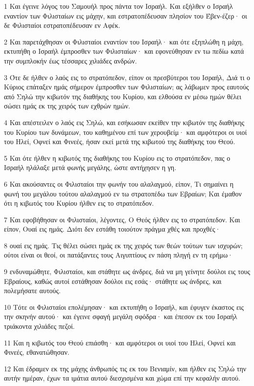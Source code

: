 \par 1 Και έγεινε λόγος του Σαμουήλ προς πάντα τον Ισραήλ. Και εξήλθεν ο Ισραήλ εναντίον των Φιλισταίων εις μάχην, και εστρατοπέδευσαν πλησίον του Έβεν-έζερ· οι δε Φιλισταίοι εστρατοπέδευσαν εν Αφέκ.
\par 2 Και παρετάχθησαν οι Φιλισταίοι εναντίον του Ισραήλ· και ότε εξηπλώθη η μάχη, εκτυπήθη ο Ισραήλ έμπροσθεν των Φιλισταίων· και εφονεύθησαν εν τω πεδίω κατά την συμπλοκήν έως τέσσαρες χιλιάδες ανδρών.
\par 3 Ότε δε ήλθεν ο λαός εις το στρατόπεδον, είπον οι πρεσβύτεροι του Ισραήλ, Διά τι ο Κύριος επάταξεν ημάς σήμερον έμπροσθεν των Φιλισταίων; ας λάβωμεν προς εαυτούς από Σηλώ την κιβωτόν της διαθήκης του Κυρίου, και ελθούσα εν μέσω ημών θέλει σώσει ημάς εκ της χειρός των εχθρών ημών.
\par 4 Και απέστειλεν ο λαός εις Σηλώ, και εσήκωσαν εκείθεν την κιβωτόν της διαθήκης του Κυρίου των δυνάμεων, του καθημένου επί των χερουβείμ· και αμφότεροι οι υιοί του Ηλεί, Οφνεί και Φινεές, ήσαν εκεί μετά της κιβωτού της διαθήκης του Θεού.
\par 5 Και ότε ήλθεν η κιβωτός της διαθήκης του Κυρίου εις το στρατόπεδον, πας ο Ισραήλ ηλάλαξε μετά φωνής μεγάλης, ώστε αντήχησεν η γη.
\par 6 Και ακούσαντες οι Φιλισταίοι την φωνήν του αλαλαγμού, είπον, Τι σημαίνει η φωνή του μεγάλου τούτου αλαλαγμού εν τω στρατοπέδω των Εβραίων; Και έμαθον ότι η κιβωτός του Κυρίου ήλθεν εις το στρατόπεδον.
\par 7 Και εφοβήθησαν οι Φιλισταίοι, λέγοντες, Ο Θεός ήλθεν εις το στρατόπεδον. Και είπον, Ουαί εις ημάς. Διότι δεν εστάθη τοιούτον πράγμα χθές και προχθές·
\par 8 ουαί εις ημάς. Τις θέλει σώσει ημάς εκ της χειρός των θεών τούτων των ισχυρών; ούτοι είναι οι θεοί, οι πατάξαντες τους Αιγυπτίους εν πάση πληγή εν τη ερήμω·
\par 9 ενδυναμώθητε, Φιλισταίοι, και στάθητε ως άνδρες, διά να μη γείνητε δούλοι εις τους Εβραίους, καθώς αυτοί εστάθησαν δούλοι εις εσάς· στάθητε ως άνδρες, και πολεμήσατε αυτούς.
\par 10 Τότε οι Φιλισταίοι επολέμησαν· και εκτυπήθη ο Ισραήλ, και έφυγεν έκαστος εις την σκηνήν αυτού· και έγεινε σφαγή μεγάλη σφόδρα· και έπεσον εκ του Ισραήλ τριάκοντα χιλιάδες πεζοί.
\par 11 Και η κιβωτός του Θεού επιάσθη· και αμφότεροι οι υιοί του Ηλεί, Οφνεί και Φινεές, εθανατώθησαν.
\par 12 Και έδραμεν εκ της μάχης άνθρωπός τις εκ του Βενιαμίν, και ήλθεν εις Σηλώ την αυτήν ημέραν, έχων τα ιμάτια αυτού διεσχισμένα και χώμα επί την κεφαλήν αυτού.
